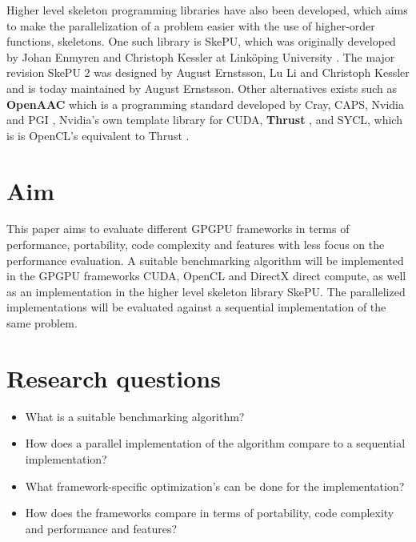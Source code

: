 Higher level skeleton programming libraries have also been developed, which aims to make the parallelization of a problem easier with the use of higher-order functions, skeletons. One such library is SkePU, which was originally developed by Johan Enmyren and Christoph Kessler at Linköping University \cite{enmyren2010skepu}. The major revision SkePU 2 was designed by August Ernstsson, Lu Li and Christoph Kessler and is today maintained by August Ernstsson. Other alternatives exists such as \textbf{OpenAAC} which is a programming standard developed by Cray, CAPS, Nvidia and PGI \cite{OpenACC}, Nvidia's own template library for CUDA, \textbf{Thrust} \cite{Thrust}, and SYCL, which is is OpenCL's equivalent to Thrust \cite{SYCL}.


\section{Aim} %

This paper aims to evaluate different GPGPU frameworks in terms of performance, portability, code complexity and features with less focus on the performance evaluation. A suitable benchmarking algorithm will be implemented in the GPGPU frameworks CUDA, OpenCL and DirectX direct compute, as well as an implementation in the higher level skeleton library SkePU. The parallelized implementations will be evaluated against a sequential implementation of the same problem.


\section{Research questions}  %

\begin{itemize}
    \item What is a suitable benchmarking algorithm?
    \item How does a parallel implementation of the algorithm compare to a sequential implementation?
    \item What framework-specific optimization's can be done for the implementation?
    \item How does the frameworks compare in terms of portability, code complexity and performance and features?
\end{itemize}


